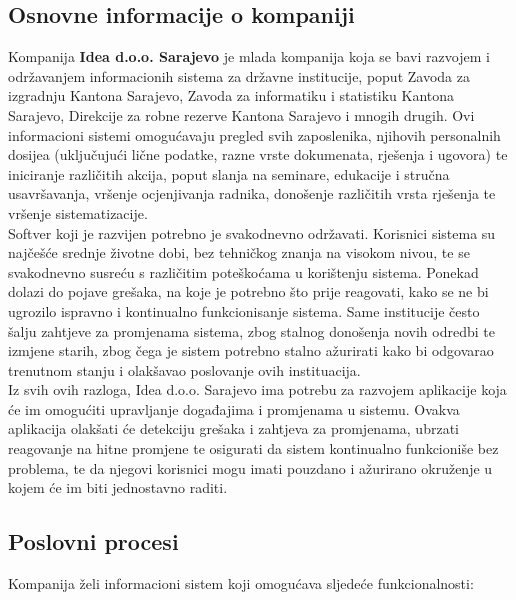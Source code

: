 \documentclass[12pt,a4paper]{article}
\begin{document}
\subsection{Osnovne informacije o kompaniji}

\quad Kompanija \textbf{Idea d.o.o. Sarajevo} je mlada kompanija koja se bavi razvojem i održavanjem informacionih sistema za državne institucije, poput Zavoda za izgradnju Kantona Sarajevo, Zavoda za informatiku i statistiku Kantona Sarajevo, Direkcije za robne rezerve Kantona Sarajevo i mnogih drugih. Ovi informacioni sistemi omogućavaju pregled svih zaposlenika, njihovih personalnih dosijea (uključujući lične podatke, razne vrste dokumenata, rješenja i ugovora) te iniciranje različitih akcija, poput slanja na seminare, edukacije i stručna usavršavanja, vršenje ocjenjivanja radnika, donošenje različitih vrsta rješenja te vršenje sistematizacije. \\

Softver koji je razvijen potrebno je svakodnevno održavati. Korisnici sistema su najčešće srednje životne dobi, bez tehničkog znanja na visokom nivou, te se svakodnevno susreću s različitim poteškoćama u korištenju sistema. Ponekad dolazi do pojave grešaka, na koje je potrebno što prije reagovati, kako se ne bi ugrozilo ispravno i kontinualno funkcionisanje sistema. Same institucije često šalju zahtjeve za promjenama sistema, zbog stalnog donošenja novih odredbi te izmjene starih, zbog čega je sistem potrebno stalno ažurirati kako bi odgovarao trenutnom stanju i olakšavao poslovanje ovih instituacija. \\

Iz svih ovih razloga, Idea d.o.o. Sarajevo ima potrebu za razvojem aplikacije koja će im omogućiti upravljanje događajima i promjenama u sistemu. Ovakva aplikacija olakšati će detekciju grešaka i zahtjeva za promjenama, ubrzati reagovanje na hitne promjene te osigurati da sistem kontinualno funkcioniše bez problema, te da njegovi korisnici mogu imati pouzdano i ažurirano okruženje u kojem će im biti jednostavno raditi.

\subsection{Poslovni procesi}

\quad Kompanija želi informacioni sistem koji omogućava sljedeće funkcionalnosti:
\end{document}
